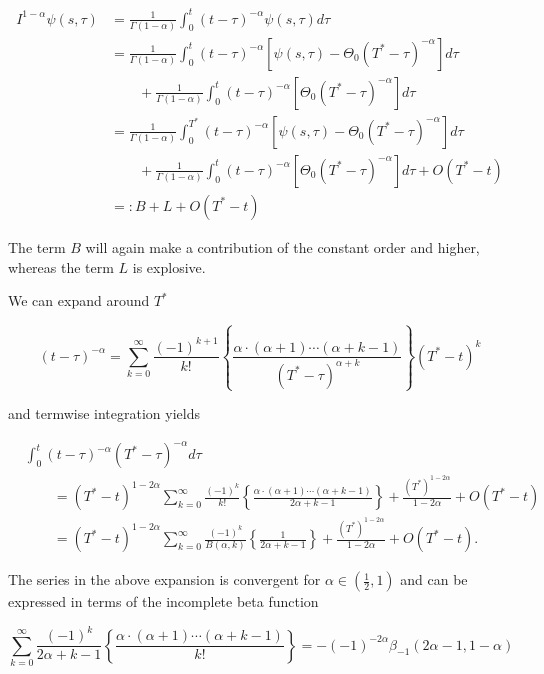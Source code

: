 \documentclass[12pt]{article}
\theoremstyle{plain}
\begin{document}
\begin{equation} \label{i1alphaexpansion}
\begin{aligned}
I^{1-\alpha}\psi(s,\tau) &= \frac{1}{\Gamma(1-\alpha)} \int _0 ^t (t-\tau)^{-\alpha} \psi(s, \tau) d\tau\\[10pt]
&= \frac{1}{\Gamma(1-\alpha)} \int _0^t(t-\tau)^{-\alpha}\left[\psi(s,\tau) - \Theta_0 (T^*-\tau)^{-\alpha} \right] d\tau\\
&\qquad + \frac{1}{\Gamma(1-\alpha)} \int _0^t(t-\tau)^{-\alpha}\left[\Theta_0(T^*-\tau)^{-\alpha}\right] d\tau\\[10pt]
&= \frac{1}{\Gamma(1-\alpha)} \int _0^{T^*}(t-\tau)^{-\alpha}\left[\psi(s,\tau) - \Theta_0(T^*-\tau)^{-\alpha} \right] d\tau\\
&\qquad + \frac{1}{\Gamma(1-\alpha)} \int _0^t(t-\tau)^{-\alpha}\left[\Theta_0(T^*-\tau)^{-\alpha}\right] d\tau + O(T^*-t)\\[10pt]
&=:B+L + O(T^*-t)
\end{aligned}
\end{equation}

The term $B$ will again make a contribution of the constant order and higher, whereas the term $L$ is explosive.

We can expand around $T^*$

$$
(t-\tau)^{-\alpha} = \sum_{k=0}^\infty \frac{(-1)^{k+1}}{k!}\left\{\frac{\alpha \cdot (\alpha + 1) \cdots (\alpha+k-1)}{(T^*-\tau)^{\alpha+k}} \right\} (T^*-t)^k
$$

and termwise integration yields

$$
\begin{aligned}
&\int_0^t (t-\tau)^{-\alpha}(T^*-\tau)^{-\alpha} d\tau\\[5pt] &\qquad=(T^*-t)^{1-2\alpha}\sum_{k=0}^\infty \frac{(-1)^{k}}{k!}\left\{\frac{\alpha \cdot (\alpha + 1) \cdots (\alpha+k-1)}{2\alpha+k-1} \right\}
+ \frac{(T^*)^{1-2\alpha}}{1-2\alpha} + O(T^*-t)\\[5pt]
&\qquad=(T^*-t)^{1-2\alpha}\sum_{k=0}^\infty \frac{(-1)^{k}}{B(\alpha, k)}\left\{\frac{1}{2\alpha+k-1} \right\} + \frac{(T^*)^{1-2\alpha}}{1-2\alpha} + O(T^*-t).
\end{aligned}
$$

The series in the above expansion is convergent for $\alpha \in (\frac 12, 1)$ and can be expressed in terms of the incomplete beta function

$$
\sum_{k=0}^{\infty} \frac{(-1)^{k}}{2 \alpha+k-1}\left\{\frac{\alpha \cdot(\alpha+1) \cdots(\alpha+k-1)}{k !}\right\}=-(-1)^{-2\alpha} \beta_{-1}(2 \alpha-1,1-\alpha)
$$
\end{document}
